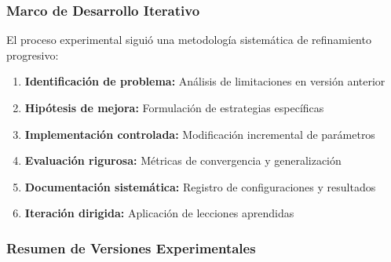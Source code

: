 \subsubsection{Marco de Desarrollo Iterativo}

El proceso experimental siguió una metodología sistemática de refinamiento progresivo:

\begin{enumerate}
    \item \textbf{Identificación de problema:} Análisis de limitaciones en versión anterior
    \item \textbf{Hipótesis de mejora:} Formulación de estrategias específicas
    \item \textbf{Implementación controlada:} Modificación incremental de parámetros
    \item \textbf{Evaluación rigurosa:} Métricas de convergencia y generalización
    \item \textbf{Documentación sistemática:} Registro de configuraciones y resultados
    \item \textbf{Iteración dirigida:} Aplicación de lecciones aprendidas
\end{enumerate}

\subsubsection{Resumen de Versiones Experimentales}

